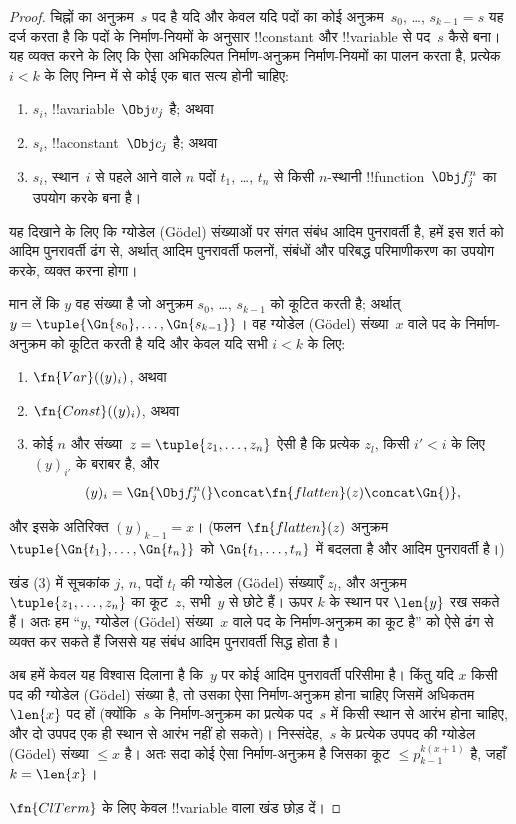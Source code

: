 \documentclass[../../../include/open-logic-section]{subfiles}
\begin{document}
\begin{proof}
चिह्नों का अनुक्रम~$s$ पद है यदि और केवल यदि पदों का कोई अनुक्रम~$s_0$,
\dots, $s_{k-1} = s$ यह दर्ज करता है कि पदों के निर्माण-नियमों के अनुसार
!!{constant} और !!{variable} से पद~$s$ कैसे बना। यह व्यक्त करने के लिए कि ऐसा
अभिकल्पित निर्माण-अनुक्रम निर्माण-नियमों का पालन करता है, प्रत्येक $i < k$ के
लिए निम्न में से कोई एक बात सत्य होनी चाहिए:
\begin{enumerate}
\item $s_i$, !!a{variable}~$\Obj v_j$ है; अथवा
\item $s_i$, !!a{constant}~$\Obj c_j$ है; अथवा
\item $s_i$, स्थान~$i$ से पहले आने वाले $n$ पदों $t_1$, \dots, $t_n$ से
  किसी $n$-स्थानी !!{function}~$\Obj f^n_j$ का उपयोग करके बना है।
\end{enumerate}
यह दिखाने के लिए कि ग्योडेल (G\"odel) संख्याओं पर संगत संबंध आदिम पुनरावर्ती
है, हमें इस शर्त को आदिम पुनरावर्ती ढंग से, अर्थात् आदिम पुनरावर्ती फलनों,
संबंधों और परिबद्ध परिमाणीकरण का उपयोग करके, व्यक्त करना होगा।

मान लें कि $y$ वह संख्या है जो अनुक्रम $s_0$, \dots, $s_{k-1}$ को कूटित करती
है; अर्थात् $y = \tuple{\Gn{s_0}, \dots, \Gn{s_{k-1}}}$। वह ग्योडेल (G\"odel)
 संख्या~$x$ वाले पद के निर्माण-अनुक्रम को कूटित करती है यदि और केवल
यदि सभी $i < k$ के लिए:
\begin{enumerate}
\item $\fn{Var}((y)_i)$, अथवा
\item $\fn{Const}((y)_i)$, अथवा
\item कोई $n$ और संख्या~$z = \tuple{z_1, \dots, z_n}$ ऐसी है कि प्रत्येक
  $z_l$, किसी $i' < i$ के लिए $(y)_{i'}$ के बराबर है, और
\[
(y)_i = \Gn{\Obj f^n_j(} \concat \fn{flatten}(z) \concat \Gn{)},
\]
\end{enumerate}
और इसके अतिरिक्त $(y)_{k-1} = x$। (फलन $\fn{flatten}(z)$ अनुक्रम
$\tuple{\Gn{t_1}, \dots, \Gn{t_n}}$ को $\Gn{t_1, \dots, t_n}$ में बदलता है
और आदिम पुनरावर्ती है।)

खंड (3) में सूचकांक $j$, $n$, पदों $t_l$ की ग्योडेल (G\"odel) संख्याएँ
$z_l$, और अनुक्रम~$\tuple{z_1, \dots, z_n}$ का कूट~$z$, सभी~$y$ से छोटे
हैं। ऊपर $k$ के स्थान पर $\len{y}$ रख सकते हैं। अतः हम ``$y$, ग्योडेल (G\"odel)
 संख्या~$x$ वाले पद के निर्माण-अनुक्रम का कूट है'' को ऐसे ढंग से
व्यक्त कर सकते हैं जिससे यह संबंध आदिम पुनरावर्ती सिद्ध होता है।

अब हमें केवल यह विश्वास दिलाना है कि~$y$ पर कोई आदिम पुनरावर्ती परिसीमा है।
किंतु यदि $x$ किसी पद की ग्योडेल (G\"odel) संख्या है, तो उसका ऐसा
निर्माण-अनुक्रम होना चाहिए जिसमें अधिकतम $\len{x}$ पद हों (क्योंकि~$s$ के
निर्माण-अनुक्रम का प्रत्येक पद~$s$ में किसी स्थान से आरंभ होना चाहिए, और दो
उपपद एक ही स्थान से आरंभ नहीं हो सकते)। निस्संदेह,~$s$ के प्रत्येक उपपद की
ग्योडेल (G\"odel) संख्या $\le x$ है। अतः सदा कोई ऐसा निर्माण-अनुक्रम है
जिसका कूट $\le p_{k-1}^{k(x+1)}$ है, जहाँ $k=\len{x}$।

$\fn{ClTerm}$ के लिए केवल !!{variable} वाला खंड छोड़ दें।
\end{proof}
\end{document}
